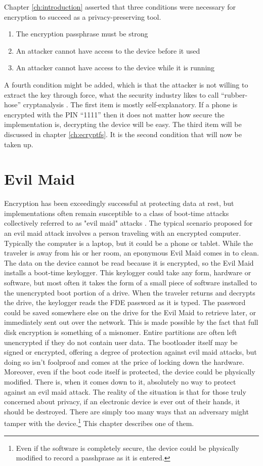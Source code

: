 Chapter \ref{ch:introduction} asserted that three conditions were necessary for encryption to succeed as a privacy-preserving tool.
\begin{enumerate}
	\item{The encryption passphrase must be strong}
	\item{An attacker cannot have access to the device before it used}
	\item{An attacker cannot have access to the device while it is running}
\end{enumerate}
A fourth condition might be added, which is that the attacker is not willing to extract the key through force, what the security
industry likes to call ``rubber-hose'' cryptanalysis \cite{rubberhose}.  The first item is mostly self-explanatory. If a phone is
encrypted with the PIN ``1111'' then it does not matter how secure the implementation is, decrypting the device will be easy. The
third item will be discussed in chapter \ref{ch:ecryptfs}.  It is the second condition that will now be taken up. 

\section{Evil Maid}

Encryption has been exceedingly successful at protecting data at rest, but implementations often remain susceptible to a class of boot-time
attacks collectively referred to as "evil maid" attacks \cite{schneiermaid}. The typical scenario proposed for an evil maid attack
involves a person traveling with an encrypted computer. Typically the computer is a laptop, but it could be a phone or tablet.
While the traveler is away from his or her room, an eponymous Evil Maid comes in to clean. The data on the
device cannot be read because it is encrypted, so the Evil Maid installs a boot-time keylogger. This keylogger could take any form,
hardware or software, but most often it takes the form of a small piece of software installed to the unencrypted boot portion of a
drive. When the traveler returns and decrypts the drive, the keylogger reads the FDE password as it is typed. The password could be
saved somewhere else on the drive for the Evil Maid to retrieve later, or immediately sent out over the network.
This is made possible by the fact that full disk encryption is something of a misnomer.  Entire partitions are often left
unencrypted if they do not contain user data.  The bootloader itself may be signed or encrypted, offering a degree of protection
against evil maid attacks, but doing so isn't foolproof \cite{attackingbitlocker} and comes at the price of locking down the
hardware. Moreover, even if the boot code itself is protected, the device could be physically modified. There is, when it comes
down to it, absolutely no way to protect against an evil maid attack.  The reality of the situation is that for those truly
concerned about privacy, if an electronic device is ever out of their hands, it should be destroyed. There are simply too many ways
that an adversary might tamper with the device.\footnote{Even if the software is completely secure, the device could be physically
modified to record a passhprase as it is entered.} This chapter describes one of them.

